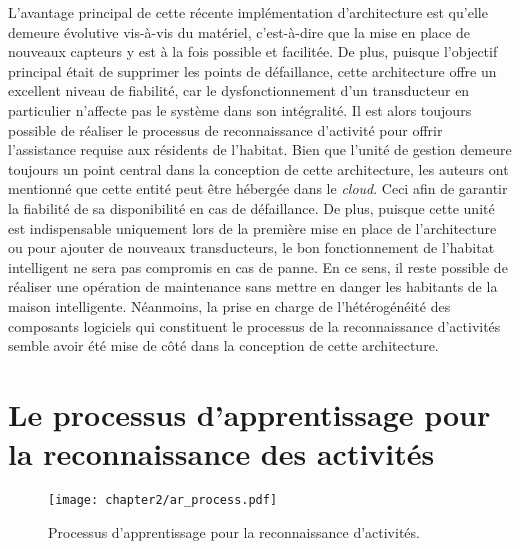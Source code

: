 L'avantage principal de cette récente implémentation d'architecture est qu'elle demeure évolutive vis-à-vis du matériel, c'est-à-dire que la mise en place de nouveaux capteurs y est à la fois possible et facilitée. De plus, puisque l'objectif principal était de supprimer les points de défaillance, cette architecture offre un excellent niveau de fiabilité, car le dysfonctionnement d'un transducteur en particulier n'affecte pas le système dans son intégralité. Il est alors toujours possible de réaliser le processus de reconnaissance d'activité pour offrir l'assistance requise aux résidents de l'habitat. Bien que l'unité de gestion demeure toujours un point central dans la conception de cette architecture, les auteurs ont mentionné que cette entité peut être hébergée dans le \textit{cloud}. Ceci afin de garantir la fiabilité de sa disponibilité en cas de défaillance. De plus, puisque cette unité est indispensable uniquement lors de la première mise en place de l'architecture ou pour ajouter de nouveaux transducteurs, le bon fonctionnement de l'habitat intelligent ne sera pas compromis en cas de panne. En ce sens, il reste possible de réaliser une opération de maintenance sans mettre en danger les habitants de la maison intelligente. Néanmoins, la prise en charge de l'hétérogénéité des composants logiciels qui constituent le processus de la reconnaissance d'activités semble avoir été mise de côté dans la conception de cette architecture.

\section{Le processus d'apprentissage pour la reconnaissance des activités}

\begin{figure}[b!]
	\centering
	\texttt{[image: chapter2/ar\_process.pdf]}
	\caption{Processus d'apprentissage pour la reconnaissance d'activités.}
	\label{fig:ar_process}
\end{figure}

